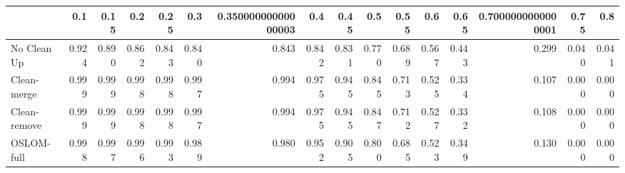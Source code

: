 \begin{tabular}{lrrrrrrrrrrrrrrr}
\toprule
{} &   0.1 &  0.15 &   0.2 &  0.25 &   0.3 & 0.35000000000000003 &   0.4 &  0.45 &   0.5 &  0.55 &   0.6 &  0.65 & 0.7000000000000001 &  0.75 &   0.8 \\
\midrule
No Clean Up  & 0.924 & 0.890 & 0.862 & 0.843 & 0.840 &               0.843 & 0.842 & 0.831 & 0.770 & 0.689 & 0.567 & 0.443 &              0.299 & 0.040 & 0.041 \\
Clean-merge  & 0.999 & 0.999 & 0.998 & 0.998 & 0.997 &               0.994 & 0.975 & 0.945 & 0.845 & 0.713 & 0.525 & 0.334 &              0.107 & 0.000 & 0.000 \\
Clean-remove & 0.999 & 0.999 & 0.998 & 0.998 & 0.997 &               0.994 & 0.975 & 0.945 & 0.847 & 0.712 & 0.527 & 0.332 &              0.108 & 0.000 & 0.000 \\
OSLOM-full   & 0.998 & 0.997 & 0.996 & 0.993 & 0.989 &               0.980 & 0.952 & 0.905 & 0.800 & 0.685 & 0.523 & 0.349 &              0.130 & 0.000 & 0.000 \\
\bottomrule
\end{tabular}
